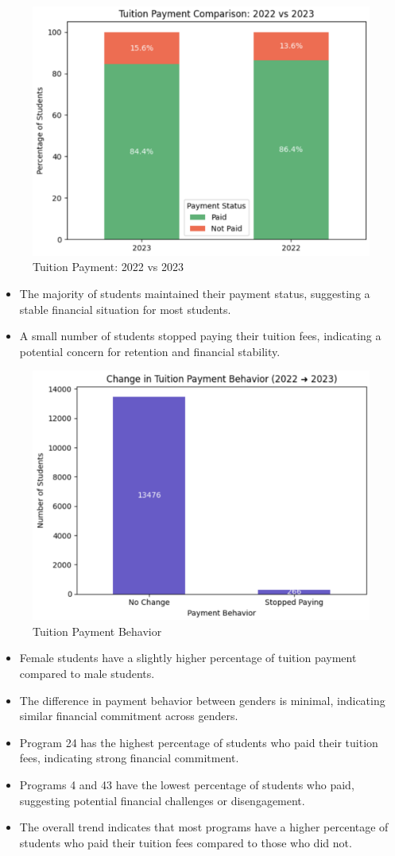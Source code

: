 \documentclass[12pt]{article}
\begin{document}
\begin{figure}[H]
    \centering
    \includegraphics[width=0.7\linewidth]{tuition_payment.png}
    \caption{Tuition Payment: 2022 vs 2023}
\end{figure}

\begin{itemize}
    \item The majority of students maintained their payment status, suggesting a stable financial situation for most students.
    \item A small number of students stopped paying their tuition fees, indicating a potential concern for retention and financial stability.
\end{itemize}

\begin{figure}[H]
    \centering
    \includegraphics[width=0.7\linewidth]{change_in_tuition_payment.png}
    \caption{Tuition Payment Behavior}
\end{figure}

\begin{itemize}
    \item Female students have a slightly higher percentage of tuition payment compared to male students.
    \item The difference in payment behavior between genders is minimal, indicating similar financial commitment across genders.
    \item Program 24 has the highest percentage of students who paid their tuition fees, indicating strong financial commitment.
    \item Programs 4 and 43 have the lowest percentage of students who paid, suggesting potential financial challenges or disengagement.
    \item The overall trend indicates that most programs have a higher percentage of students who paid their tuition fees compared to those who did not.
\end{itemize}
\end{document}
